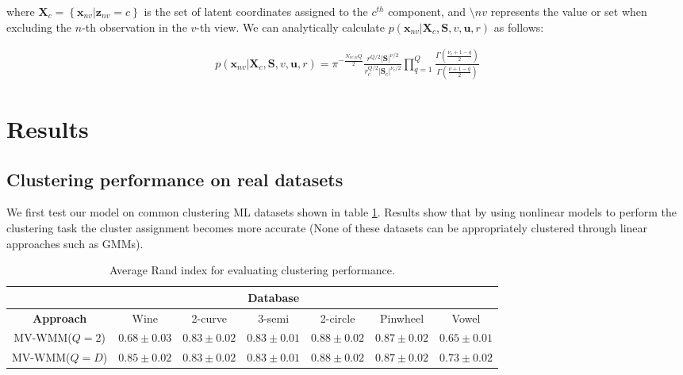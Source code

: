 \documentclass[]{article}
\newcommand{\Scluster}{\mathbf{S}}
\newcommand{\setX}{\mathbf{X}}
\newcommand{\obspv}{\mathbf{x}_{nv}}
\begin{document}
where $\setX_c = \left\{\obspv|\mathbf{z}_{nv}=c\right\}$ is the set of latent coordinates
assigned to the $c^{th}$ component, and $\setminus{nv}$ represents
the value or set when excluding the $n$-th observation in the $v$-th view. We can analytically calculate $p\left(\obspv|\setX_c, \Scluster,v,\mathbf{u},r\right)$  as follows:

\begin{align*}
p\left(\obspv|\setX_c, \Scluster,v,\mathbf{u},r\right) = \pi^{-\frac{N_{vc\setminus n}Q}{2}}\frac{r^{Q/2}|\Scluster|^{\nu/2}}{r_c^{Q/2}|\Scluster_c|^{\nu_c/2}}\prod_{q=1}^{Q}\frac{\Gamma\left(\frac{\nu_c + 1 -q}{2}\right)}{\Gamma\left(\frac{\nu + 1 -q}{2}\right)}
\end{align*}


%
%


\section{Results}

\subsection{Clustering performance on real datasets}

We first test our model on common clustering ML datasets shown in table \ref{tab:comparison1}. Results show that by using nonlinear models to perform the clustering task the cluster assignment becomes more accurate (None of these
	datasets can be appropriately clustered through linear approaches such as GMMs).

\begin{table}[ht!]
	\centering
	\caption{Average Rand index for evaluating clustering performance.}
	\label{tab:comparison1}
	\begin{tabular}{c c c c c c c}
		\cline{2-7}
		& \multicolumn{5}{c}{\textbf{Database}}\\
		\hline
		\textbf{Approach} &  	Wine & 2-curve & 3-semi & 2-circle & Pinwheel& Vowel\\
		\hline\hline
		\hline
		MV-WMM($Q=2$) & $0.68\pm0.03$  &$0.83\pm0.02$ &$0.83\pm0.01$&$0.88\pm0.02$&$0.87\pm0.02$ & $0.65\pm0.01$\\
		MV-WMM($Q=D$) & $0.85\pm 0.02$ &$0.83\pm0.02$&$0.83\pm0.01$&$0.88\pm0.02$&$0.87\pm0.02$&$0.73\pm0.02$\\
		\hline

	\end{tabular}
\end{table}
\end{document}
